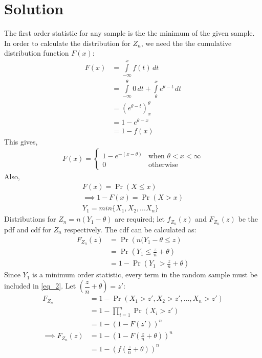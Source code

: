 \documentclass[journal,12pt,twocolumn]{IEEEtran}
\providecommand{\pr}[1]{\ensuremath{\Pr\left(#1\right)}}
\providecommand{\brak}[1]{\ensuremath{\left(#1\right)}}
\theoremstyle{remark}
\numberwithin{equation}{subsection}
\begin{document}
\section{\textbf{Solution}}
The first order statistic for any sample is the the minimum of the given sample. In order to calculate the distribution for $Z_n$, we need the the cumulative distribution function $F(x)$:\\
\begin{align}
  F(x) &=\displaystyle\int\limits_{-\infty}^{x} f(t) \,dt\\
  &= \displaystyle\int\limits_{-\infty}^{\theta}0\,dt + \displaystyle\int\limits_{\theta}^{x}e^{\theta-t}\,dt\\
  &=\brak{e^{\theta-t}}_{x}^{\theta}\\
  &= 1-e^{\theta-x} \\
  &= 1-f(x) \label{eq_1}
\end{align}
This gives,
\begin{align}
    F(x) = 
    \begin{cases}
    1-e^{-(x-\theta)} &\text{when }\theta<x<\infty\\
    0 &\text{otherwise}
    \end{cases}
\end{align}
Also,
\begin{align}
    F(x) = \pr{X\leq x}\\
    \implies 1-F(x) = \pr{X>x}\\
    Y_1 = \textit{min}\{X_1, X_2, ... X_n\}
\end{align}
Distributions for $Z_n = n(Y_1-\theta)$ are required; let $f_{Z_n}(z)$ and $F_{Z_n}(z)$ be the pdf and cdf for $Z_n$ respectively. The cdf can be calculated as: 
\begin{align}
    F_{Z_n}(z) &= \pr{n(Y_1-\theta\leq z}\\
    &= \pr{Y_1\leq \frac{z}{n} +\theta}\\
    &= 1-\pr{Y_1\ > \frac{z}{n} +\theta}\label{eq_2}
\end{align}
Since $Y_1$ is a minimum order statistic, every term in the random sample must be included in \eqref{eq_2}. Let $\brak{\dfrac{z}{n}+\theta} = z'$:
\begin{align}
    F_{Z_n}&= 1-\pr{X_1>z', X_2>z', ..., X_n>z'}\nonumber\\
    &= 1-\prod_{i=1}^{n}\pr{X_i>z'}\nonumber\\
    &= 1-\brak{1-F(z')}^n\nonumber\\
    \implies F_{Z_n}(z) &= 1-\brak{1-F\brak{\frac{z}{n}+\theta}}^n\label{eq_3}\\
    &=1-\brak{f\brak{\frac{z}{n}+\theta}}^n 
\end{align}
\end{document}

